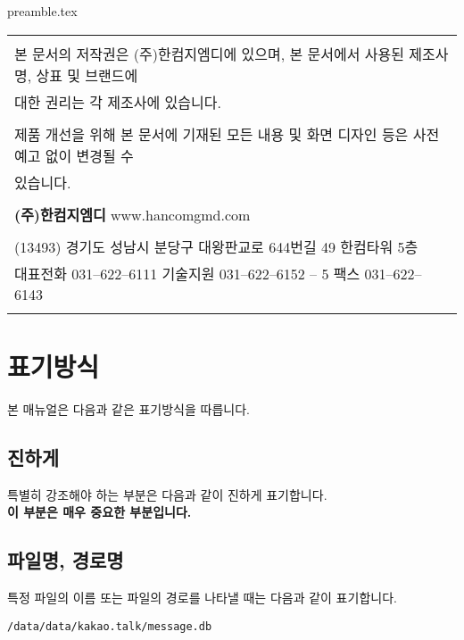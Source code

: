  {preamble.tex}




\begin{table}[b!]
\centering
\begin{tabular}{|l|} \hline
\\
본 문서의 저작권은 (주)한컴지엠디에 있으며, 본 문서에서 사용된 제조사명, 상표 및 브랜드에 \\대한 권리는
각 제조사에 있습니다. \\
\\
제품 개선을 위해 본 문서에 기재된 모든 내용 및 화면 디자인 등은 사전예고 없이 변경될 수 \\있습니다. \\
\\
\LARGE\textbf{(주)한컴지엠디} {\large www.hancomgmd.com} \\
\\
(13493) 경기도 성남시 분당구 대왕판교로 644번길 49 한컴타워 5층\\
대표전화 031--622--6111 기술지원 031--622--6152 -- 5 팩스 031--622--6143 \\ \\ \hline
\end{tabular}
\end{table}
\clearpage

\tableofcontents
\clearpage
\listoffigures
\clearpage

\section*{표기방식}
본 매뉴얼은 다음과 같은 표기방식을 따릅니다.

\subsection*{진하게}
특별히 강조해야 하는 부분은 다음과 같이 진하게 표기합니다. \\
\textbf{이 부분은 매우 중요한 부분입니다.}

\subsection*{파일명, 경로명}
특정 파일의 이름 또는 파일의 경로를 나타낼 때는 다음과 같이 표기합니다.
\begin{verbatim}/data/data/kakao.talk/message.db \end{verbatim} 

